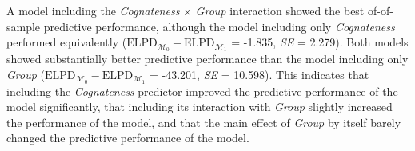 \documentclass[
  letterpaper,
  DIV=11,
  numbers=noendperiod]{scrartcl}
\begin{document}
A model including the \emph{Cognateness} \(\times\) \emph{Group}
interaction showed the best of-of-sample predictive performance,
although the model including only \emph{Cognateness} performed
equivalently
(\(\text{ELPD}_{\mathcal{M_0}} - \text{ELPD}_{\mathcal{M_1}}\) = -1.835,
\emph{SE} = 2.279). Both models showed substantially better predictive
performance than the model including only \emph{Group}
(\(\text{ELPD}_{\mathcal{M_0}} - \text{ELPD}_{\mathcal{M_1}}\) =
-43.201, \emph{SE} = 10.598). This indicates that including the
\emph{Cognateness} predictor improved the predictive performance of the
model significantly, that including its interaction with \emph{Group}
slightly increased the performance of the model, and that the main
effect of \emph{Group} by itself barely changed the predictive
performance of the model.
\end{document}
